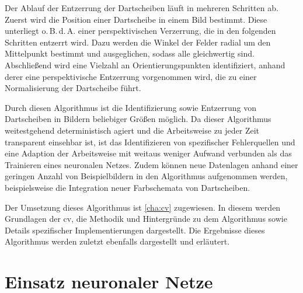 Der Ablauf der Entzerrung der Dartscheiben läuft in mehreren Schritten ab. Zuerst wird die Position einer Dartscheibe in einem Bild bestimmt. Diese unterliegt o.\,B.\,d.\,A. einer perspektivischen Verzerrung, die in den folgenden Schritten entzerrt wird. Dazu werden die Winkel der Felder radial um den Mittelpunkt bestimmt und ausgeglichen, sodass alle gleichwertig sind. Abschließend wird eine Vielzahl an Orientierungspunkten identifiziert, anhand derer eine perspektivische Entzerrung vorgenommen wird, die zu einer Normalisierung der Dartscheibe führt.

Durch diesen Algorithmus ist die Identifizierung sowie Entzerrung von Dartscheiben in Bildern beliebiger Größen möglich. Da dieser Algorithmus weitestgehend deterministisch agiert und die Arbeitsweise zu jeder Zeit transparent einsehbar ist, ist das Identifizieren von spezifischer Fehlerquellen und eine Adaption der Arbeitsweise mit weitaus weniger Aufwand verbunden als das Trainieren eines neuronalen Netzes. Zudem können neue Datenlagen anhand einer geringen Anzahl von Beispielbildern in den Algorithmus aufgenommen werden, beispielsweise die Integration neuer Farbschemata von Dartscheiben.

Der Umsetzung dieses Algorithmus ist \autoref{cha:cv} zugewiesen. In diesem werden Grundlagen der \ac{cv}, die Methodik und Hintergründe zu dem Algorithmus sowie Details spezifischer Implementierungen dargestellt. Die Ergebnisse dieses Algorithmus werden zuletzt ebenfalls dargestellt und erläutert.




\section{Einsatz neuronaler Netze}
\label{sec:einsatz_nn}

